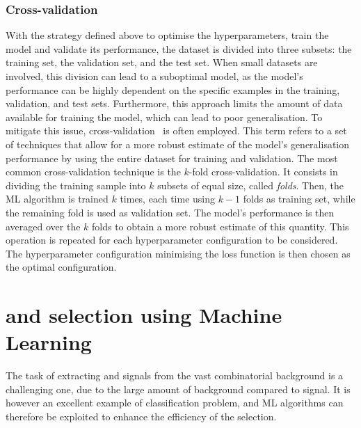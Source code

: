 \subsubsection{Cross-validation}

With the strategy defined above to optimise the hyperparameters, train the model and validate its performance, the dataset is divided into three subsets: the training set, the validation set, and the test set. When small datasets are involved, this division can lead to a suboptimal model, as the model's performance can be highly dependent on the specific examples in the training, validation, and test sets. Furthermore, this approach limits the amount of data available for training the model, which can lead to poor generalisation. To mitigate this issue, cross-validation~\cite{stone1974cross} is often employed. This term refers to a set of techniques that allow for a more robust estimate of the model's generalisation performance by using the entire dataset for training and validation. The most common cross-validation technique is the $k$-fold cross-validation. It consists in dividing the training sample into $k$ subsets of equal size, called \emph{folds}. Then, the ML algorithm is trained $k$ times, each time using $k-1$ folds as training set, while the remaining fold is used as validation set. The model's performance is then averaged over the $k$ folds to obtain a more robust estimate of this quantity. This operation is repeated for each hyperparameter configuration to be considered. The hyperparameter configuration minimising the loss function is then chosen as the optimal configuration.

\section{\texorpdfstring{\ds and \dpl selection using Machine Learning}{Ds+ and D+ selection using Machine Learning}}

The task of extracting \ds and \dpl signals from the vast combinatorial background is a challenging one, due to the large amount of background compared to signal. It is however an excellent example of classification problem, and ML algorithms can therefore be exploited to enhance the efficiency of the selection. 

